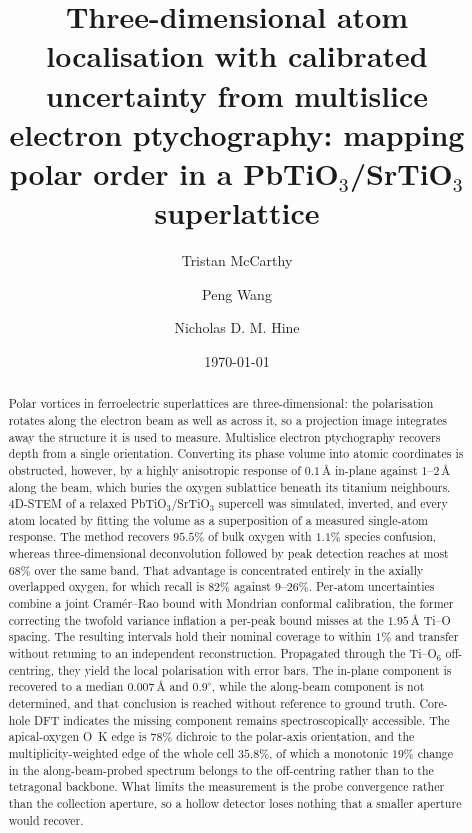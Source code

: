 \documentclass[aps,prb,twocolumn,superscriptaddress,floatfix,nofootinbib]{revtex4-2}
\begin{document}
\title{Three-dimensional atom localisation with calibrated uncertainty from multislice
electron ptychography: mapping polar order in a PbTiO$_3$/SrTiO$_3$ superlattice}

\author{Tristan McCarthy}
\author{Peng Wang}
\author{Nicholas D. M. Hine}

\date{\today}

\begin{abstract}
Polar vortices in ferroelectric superlattices are three-dimensional: the polarisation rotates
along the electron beam as well as across it, so a projection image integrates away the
structure it is used to measure. Multislice electron ptychography recovers depth from a single
orientation. Converting its phase volume into atomic coordinates is obstructed, however, by a
highly anisotropic response of $0.1$\,\AA{} in-plane against $1$--$2$\,\AA{} along the beam,
which buries the oxygen sublattice beneath its titanium neighbours. 4D-STEM of a relaxed
PbTiO$_3$/SrTiO$_3$ supercell was simulated, inverted, and every atom located by fitting the
volume as a superposition of a measured single-atom response. The method recovers $95.5\%$ of
bulk oxygen with $1.1\%$ species confusion, whereas three-dimensional deconvolution followed by
peak detection reaches at most $68\%$ over the same band. That advantage is concentrated entirely in the axially
overlapped oxygen, for which recall is $82\%$ against $9$--$26\%$. Per-atom uncertainties combine
a joint Cram\'er--Rao bound with Mondrian conformal calibration, the former correcting the
twofold variance inflation a per-peak bound misses at the $1.95$\,\AA{} Ti--O spacing. The
resulting intervals hold their nominal coverage to within $1\%$ and transfer without retuning to
an independent reconstruction. Propagated through the Ti--O$_6$ off-centring, they yield the
local polarisation with error bars. The in-plane component is recovered to a median
$0.007$\,\AA{} and $0.9^\circ$, while the along-beam component is not determined, and that
conclusion is reached without reference to ground truth. Core-hole DFT indicates the missing
component remains spectroscopically accessible. The apical-oxygen O~K edge is $78\%$ dichroic to
the polar-axis orientation, and the multiplicity-weighted edge of the whole cell $35.8\%$, of
which a monotonic $19\%$ change in the along-beam-probed spectrum belongs to the off-centring
rather than to the tetragonal backbone. What limits the measurement is the probe convergence
rather than the collection aperture, so a hollow detector loses nothing that a smaller aperture
would recover.
\end{abstract}
\end{document}
